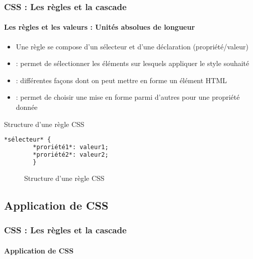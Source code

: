 \documentclass[xcolor=table]{beamer}
\begin{document}
\begin{frame}[fragile]
\frametitle{CSS : Les règles et la cascade}
\framesubtitle{Les règles et les valeurs : Unités absolues de longueur}

\begin{minipage}{0.60\textwidth} 
	\begin{itemize}
		\item Une règle se compose d'un sélecteur et d'une déclaration (propriété/valeur)
		\item {} : permet de sélectionner les éléments sur lesquels appliquer le style souhaité
		\item {} : différentes façons dont on peut mettre en forme un élément HTML
		\item {} : permet de choisir une mise en forme parmi d'autres pour une propriété donnée
	\end{itemize}
\end{minipage}
%
\begin{minipage}{0.38\textwidth}
	\begin{exampleblock}{Structure d'une règle CSS}
		\lstset{escapeinside=**}
		\scriptsize\bfseries
		\begin{lstlisting}[language={html}]
		*sélecteur* {
		*proriété1*: valeur1;
		*proriété2*: valeur2;
		}
		\end{lstlisting}
	\end{exampleblock}
	\begin{figure}
		\centering
		\caption{Structure d'une règle CSS \cite{mdn}}
	\end{figure}
\end{minipage}

\end{frame}

\subsection{Application de CSS}

\begin{frame}[fragile]
\frametitle{CSS : Les règles et la cascade}
\framesubtitle{Application de CSS}

\end{frame}
\end{document}
